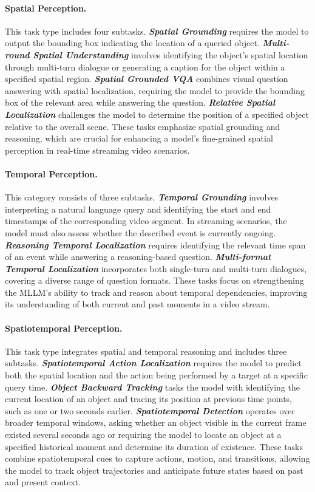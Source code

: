 \paragraph{Spatial Perception.} This task type includes four subtasks. \textbf{\textit{Spatial Grounding}} requires the model to output the bounding box indicating the location of a queried object. \textbf{\textit{Multi-round Spatial Understanding}} involves identifying the object’s spatial location through multi-turn dialogue or generating a caption for the object within a specified spatial region. \textbf{\textit{Spatial Grounded VQA}} combines visual question answering with spatial localization, requiring the model to provide the bounding box of the relevant area while answering the question. \textbf{\textit{Relative Spatial Localization}} challenges the model to determine the position of a specified object relative to the overall scene. These tasks emphasize spatial grounding and reasoning, which are crucial for enhancing a model’s fine-grained spatial perception in real-time streaming video scenarios.

\paragraph{Temporal Perception.} This category consists of three subtasks. \textbf{\textit{Temporal Grounding}} involves interpreting a natural language query and identifying the start and end timestamps of the corresponding video segment. In streaming scenarios, the model must also assess whether the described event is currently ongoing. \textbf{\textit{Reasoning Temporal Localization}} requires identifying the relevant time span of an event while answering a reasoning-based question. \textbf{\textit{Multi-format Temporal Localization}} incorporates both single-turn and multi-turn dialogues, covering a diverse range of question formats. These tasks focus on strengthening the MLLM’s ability to track and reason about temporal dependencies, improving its understanding of both current and past moments in a video stream.

\paragraph{Spatiotemporal Perception.} This task type integrates spatial and temporal reasoning and includes three subtasks. \textbf{\textit{Spatiotemporal Action Localization}} requires the model to predict both the spatial location and the action being performed by a target at a specific query time. \textbf{\textit{Object Backward Tracking}} tasks the model with identifying the current location of an object and tracing its position at previous time points, such as one or two seconds earlier. \textbf{\textit{Spatiotemporal Detection}} operates over broader temporal windows, asking whether an object visible in the current frame existed several seconds ago or requiring the model to locate an object at a specified historical moment and determine its duration of existence. These tasks combine spatiotemporal cues to capture actions, motion, and transitions, allowing the model to track object trajectories and anticipate future states based on past and present context.

